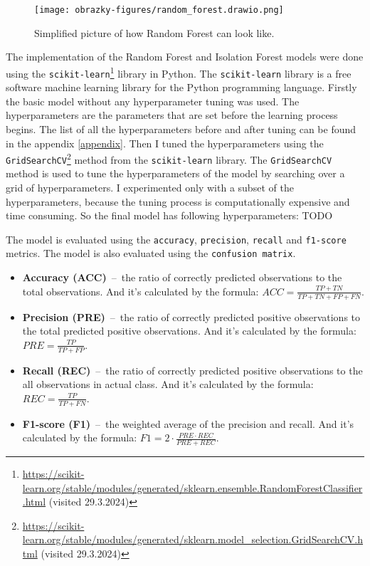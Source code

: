 \begin{figure}
    \centering
    \texttt{[image: obrazky-figures/random\_forest.drawio.png]}
    \caption{Simplified picture of how Random Forest can look like.}
    \label{fig:random_forest}
\end{figure}

The implementation of the Random Forest and Isolation Forest models were done using the \texttt{scikit-learn}\footnote[1]{\url{https://scikit-learn.org/stable/modules/generated/sklearn.ensemble.RandomForestClassifier.html} (visited 29.3.2024)} library in Python. 
The \texttt{scikit-learn} library is a free software machine learning library for the Python programming language.
Firstly the basic model without any hyperparameter tuning was used. The hyperparameters are the parameters that are set before the learning process begins.
The list of all the hyperparameters before and after tuning can be found in the appendix \ref{appendix}. 
Then I tuned the hyperparameters using the \texttt{GridSearchCV}\footnote{\url{https://scikit-learn.org/stable/modules/generated/sklearn.model_selection.GridSearchCV.html} (visited 29.3.2024)} method from the \texttt{scikit-learn} library. The \texttt{GridSearchCV} method is used to tune the hyperparameters of the model by searching over a grid of hyperparameters.
I experimented only with a subset of the hyperparameters, because the tuning process is computationally expensive and time consuming. 
So the final model has following hyperparameters: 
TODO

The model is evaluated using the \texttt{accuracy}, \texttt{precision}, \texttt{recall} and \texttt{f1-score} metrics. The model is also evaluated using the \texttt{confusion matrix}.
\begin{itemize}
    \item \textbf{Accuracy (ACC)}  \,--\, the ratio of correctly predicted observations to the total observations. And it's calculated by the formula: $ACC = \frac{TP + TN}{TP + TN + FP + FN}$.
    \item \textbf{Precision (PRE)} \,--\, the ratio of correctly predicted positive observations to the total predicted positive observations. And it's calculated by the formula: $PRE = \frac{TP}{TP + FP}$.
    \item \textbf{Recall (REC)} \,--\, the ratio of correctly predicted positive observations to the all observations in actual class. And it's calculated by the formula: $REC = \frac{TP}{TP + FN}$.
    \item \textbf{F1-score (F1)} \,--\, the weighted average of the precision and recall. And it's calculated by the formula: $F1 = 2 \cdot \frac{PRE \cdot REC}{PRE + REC}$.
\end{itemize}


